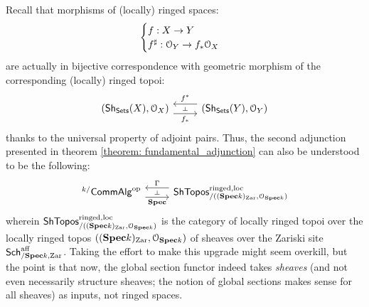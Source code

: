                 \begin{corollary} \label{coro: invoking_locally_ringed_topoi}
                    Recall that morphisms of (locally) ringed spaces:
                        $$
                            \begin{cases}
                                f: X \to Y
                                \\
                                f^{\sharp}: \mathcal{O}_Y \to f_*\mathcal{O}_X
                            \end{cases}
                        $$
                    are actually in bijective correspondence with geometric morphism of the corresponding (locally) ringed topoi:
                        $$
                            \begin{tikzcd}
                            	{\left(\Sh_{\Sets}(X), \calO_X\right)} & {\left(\Sh_{\Sets}(Y), \calO_Y\right)}
                            	\arrow[""{name=0, anchor=center, inner sep=0}, "f_*"', shift right=2, from=1-1, to=1-2]
                            	\arrow[""{name=1, anchor=center, inner sep=0}, "f^*"', shift right=2, from=1-2, to=1-1]
                            	\arrow["\dashv"{anchor=center, rotate=-90}, draw=none, from=1, to=0]
                            \end{tikzcd}
                        $$
                    thanks to the universal property of adjoint pairs. Thus, the second adjunction presented in theorem \ref{theorem: fundamental_adjunction} can also be understood to be the following:
                        $$
                            \begin{tikzcd}
                            	{{}^{k/}\Comm\Alg^{\op}} & {\Sh\Topos^{\ringed, \loc}_{/\left((\Spec k)_{\Zar}, \calO_{\Spec k}\right)}}
                            	\arrow[""{name=0, anchor=center, inner sep=0}, "\Spec"', shift right=2, from=1-1, to=1-2]
                            	\arrow[""{name=1, anchor=center, inner sep=0}, "\Gamma"', shift right=2, from=1-2, to=1-1]
                            	\arrow["\dashv"{anchor=center, rotate=-90}, draw=none, from=1, to=0]
                            \end{tikzcd}
                        $$
                    wherein $\mathsf{Sh}\mathsf{Topos}^{\mathrm{ringed}, \mathrm{loc}}_{/\left((\mathbf{Spec} k)_{\mathrm{Zar}}, \mathcal{O}_{\mathbf{Spec} k}\right)}$ is the category of locally ringed topoi over the locally ringed topos $\left((\mathbf{Spec} k)_{\mathrm{Zar}}, \mathcal{O}_{\mathbf{Spec} k}\right)$ of sheaves over the Zariski site $\mathsf{Sch}^{\mathrm{aff}}_{/\mathbf{Spec} k, \mathrm{Zar}}$. Taking the effort to make this upgrade might seem overkill, but the point is that now, the global section functor indeed takes \textit{sheaves} (and not even necessarily structure sheaves; the notion of global sections makes sense for all sheaves) as inputs, not ringed spaces.
                \end{corollary}
                    
